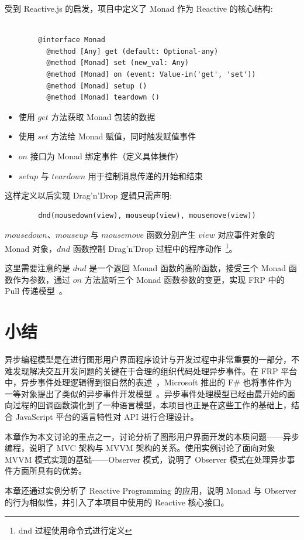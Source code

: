受到 Reactive.js 的启发，项目中定义了 Monad 作为 Reactive 的核心结构:

\begin{verbatim}

        @interface Monad
          @method [Any] get (default: Optional-any)
          @method [Monad] set (new_val: Any)
          @method [Monad] on (event: Value-in('get', 'set'))
          @method [Monad] setup ()
          @method [Monad] teardown ()

\end{verbatim}

\begin{itemize}
  \item 使用 $get$ 方法获取 Monad 包装的数据
  \item 使用 $set$ 方法给 Monad 赋值，同时触发赋值事件
  \item $on$ 接口为 Monad 绑定事件（定义具体操作）
  \item $setup$ 与 $teardown$ 用于控制消息传递的开始和结束
\end{itemize}

这样定义以后实现 Drag'n'Drop 逻辑只需声明:

\begin{verbatim}
        dnd(mousedown(view), mouseup(view), mousemove(view))
\end{verbatim}

$mousedown$、$mouseup$ 与 $mousemove$ 函数分别产生 $view$ 对应事件对象的 Monad 对象，$dnd$ 函数控制 Drag'n'Drop 过程中的程序动作~\footnote{dnd 过程使用命令式进行定义}。

这里需要注意的是 $dnd$ 是一个返回 Monad 函数的高阶函数，接受三个 Monad 函数作为参数，通过 $on$ 方法监听三个 Monad 函数参数的变更，实现 FRP 中的 Pull 传递模型~\cite{Elliott:2009:PFR:1596638.1596643}。

\section{小结}

异步编程模型是在进行图形用户界面程序设计与开发过程中非常重要的一部分，不难发现解决交互开发问题的关键在于合理的组织代码处理异步事件。在 FRP 平台中，异步事件处理逻辑得到很自然的表述~\cite{Wan:2002:EF:645772.667941}，Microsoft 推出的 F\# 也将事件作为一等对象提出了类似的异步事件开发模型~\cite{Syme:2011:FAP:1946313.1946334}。异步事件处理模型已经由最开始的面向过程的回调函数演化到了一种语言模型，本项目也正是在这些工作的基础上，结合 JavaScript 平台的语言特性对 API 进行合理设计。

本章作为本文讨论的重点之一，讨论分析了图形用户界面开发的本质问题——异步编程，说明了 MVC 架构与 MVVM 架构的关系。使用实例讨论了面向对象 MVVM 模式实现的基础——Observer 模式，说明了 Observer 模式在处理异步事件方面所具有的优势。

本章还通过实例分析了 Reactive Programming 的应用，说明 Monad 与 Observer 的行为相似性，并引入了本项目中使用的 Reactive 核心接口。


